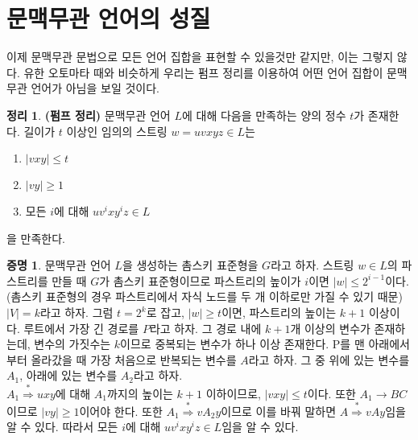 \documentclass[b5paper, 10pt]{book}
\theoremstyle{definition}
\newtheorem{thm}[defn]{정리}
\newtheorem*{pf}{증명}
\begin{document}
\section{문맥무관 언어의 성질}
이제 문맥무관 문법으로 모든 언어 집합을 표현할 수 있을것만 같지만, 이는 그렇지 않다. 
유한 오토마타 때와 비슷하게 우리는 펌프 정리를 이용하여 어떤 언어 집합이 문맥무관 언어가 
아님을 보일 것이다.
\begin{thm}
\textbf{(펌프 정리)} 문맥무관 언어 $L$에 대해 다음을 만족하는 양의 정수 $t$가 존재한다.
 길이가 $t$ 이상인 임의의 스트링 $w = uvxyz\in L$는
\begin{enumerate}
    \item $\vert vxy \vert \le t$ 
    \item $\vert vy \vert \ge 1$ 
    \item 모든 $i$에 대해 $uv^i xy^i z \in L$
\end{enumerate}
을 만족한다. 
\end{thm}
\begin{pf}
문맥무관 언어 $L$을 생성하는 촘스키 표준형을 $G$라고 하자. 스트링 $w \in L$의 
파스트리를 만들 때 $G$가 촘스키 표준형이므로 파스트리의 높이가 $i$이면 
$\vert w\vert \le 2^{i-1}$이다. (촘스키 표준형의 경우 파스트리에서 
자식 노드를 두 개 이하로만 가질 수 있기 때문) \\ 
$\vert V \vert = k$라고 하자. 그럼 $t = 2^{k}$로 잡고, $\vert w  \vert \ge t$이면, 
파스트리의 높이는 $k+1$ 이상이다. 루트에서 가장 긴 경로를 $P$라고 하자. 
그 경로 내에 $k+1$개 이상의 변수가 존재하는데, 변수의 가짓수는 $k$이므로 
중복되는 변수가 하나 이상 존재한다. P를 맨 아래에서부터 올라갔을 때 가장 
처음으로 반복되는 변수를 $A$라고 하자. 그 중 위에 있는 변수를 $A_1$, 아래에 있는 변수를
$A_2$라고 하자.  \\ 
$A_1 \overset{*}{\Rightarrow} uxy$에 대해 $A_1$까지의 높이는 $k+1$ 이하이므로, 
$\vert vxy\vert \le t$이다. 또한
$A_1 \rightarrow BC$이므로 $\vert vy\vert \ge 1$이어야 한다. 또한 $A_1 \overset{*}{\Rightarrow}
vA_2y $이므로 이를 바꿔 말하면 $A \overset{*}{\Rightarrow} vAy$임을 알 수 있다. 따라서 모든 $i$에 대해
$uv^i x y^i z \in L$임을 알 수 있다. 
\end{pf}
\begin{figure}[!ht]
    \centering
\caption{}
\end{figure}
\end{document}
